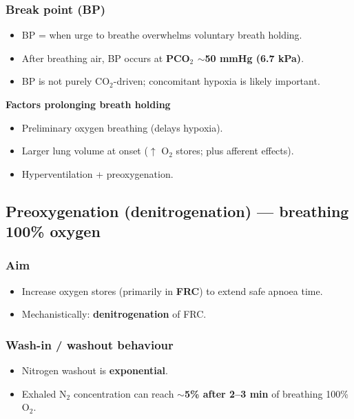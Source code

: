 \documentclass[11pt,a4paper]{article}
\begin{document}
\subsubsection{Break point (BP)}
\begin{itemize}
  \item BP = when urge to breathe overwhelms voluntary breath holding.
  \item After breathing air, BP occurs at \textbf{PCO$_2$ $\sim$50 mmHg (6.7 kPa)}.
  \item BP is not purely CO$_2$-driven; concomitant hypoxia is likely important.
\end{itemize}

\textbf{Factors prolonging breath holding}
\begin{itemize}
  \item Preliminary oxygen breathing (delays hypoxia).
  \item Larger lung volume at onset ($\uparrow$ O$_2$ stores; plus afferent effects).
  \item Hyperventilation + preoxygenation.
\end{itemize}

\subsection{Preoxygenation (denitrogenation) — breathing 100\% oxygen}

\subsubsection{Aim}
\begin{itemize}
  \item Increase oxygen stores (primarily in \textbf{FRC}) to extend safe apnoea time.
  \item Mechanistically: \textbf{denitrogenation} of FRC.
\end{itemize}

\subsubsection{Wash-in / washout behaviour}
\begin{itemize}
  \item Nitrogen washout is \textbf{exponential}.
  \item Exhaled N$_2$ concentration can reach $\sim$\textbf{5\% after 2--3 min} of breathing 100\% O$_2$.
\end{itemize}
\end{document}
